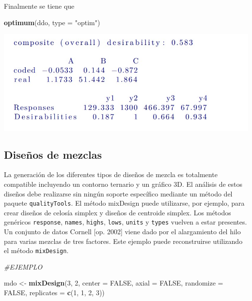 \documentclass[
]{book}
\newenvironment{Shaded}{\begin{snugshade}}{\end{snugshade}}
\newcommand{\AttributeTok}[1]{\textcolor[rgb]{0.13,0.29,0.53}{#1}}
\newcommand{\CommentTok}[1]{\textcolor[rgb]{0.56,0.35,0.01}{\textit{#1}}}
\newcommand{\ConstantTok}[1]{\textcolor[rgb]{0.56,0.35,0.01}{#1}}
\newcommand{\DecValTok}[1]{\textcolor[rgb]{0.00,0.00,0.81}{#1}}
\newcommand{\FunctionTok}[1]{\textcolor[rgb]{0.13,0.29,0.53}{\textbf{#1}}}
\newcommand{\NormalTok}[1]{#1}
\newcommand{\OtherTok}[1]{\textcolor[rgb]{0.56,0.35,0.01}{#1}}
\newcommand{\StringTok}[1]{\textcolor[rgb]{0.31,0.60,0.02}{#1}}
\begin{document}
Finalmente se tiene que

\begin{Shaded}
\begin{Highlighting}[]
\FunctionTok{optimum}\NormalTok{(ddo, }\AttributeTok{type =} \StringTok{"optim"}\NormalTok{)}
\end{Highlighting}
\end{Shaded}

\includegraphics[width=7.29167in,height=\textheight]{graficos/dario4.jpg}

\hypertarget{diseuxf1os-de-mezclas}{%
\subsection{Diseños de mezclas}\label{diseuxf1os-de-mezclas}}

La generación de los diferentes tipos de diseños de mezcla es totalmente compatible
incluyendo un contorno ternario y un gráfico 3D. El análisis de estos diseños debe realizarse sin ningún soporte específico mediante un método del paquete \texttt{qualityTools}.
El método mixDesign puede utilizarse, por ejemplo, para crear diseños de celosía simplex y diseños de centroide simplex.
Los métodos genéricos \texttt{response}, \texttt{names}, \texttt{highs}, \texttt{lows}, \texttt{units} y \texttt{types} vuelven a estar presentes.
Un conjunto de datos Cornell {[}op. 2002{]} viene dado por el alargamiento del hilo para varias mezclas de tres factores. Este ejemplo puede reconstruirse utilizando el método \texttt{mixDesign}.

\begin{Shaded}
\begin{Highlighting}[]
\CommentTok{\#EJEMPLO }

\NormalTok{mdo }\OtherTok{\textless{}{-}} \FunctionTok{mixDesign}\NormalTok{(}\DecValTok{3}\NormalTok{, }\DecValTok{2}\NormalTok{, }\AttributeTok{center =} \ConstantTok{FALSE}\NormalTok{, }\AttributeTok{axial =} \ConstantTok{FALSE}\NormalTok{, }\AttributeTok{randomize =} \ConstantTok{FALSE}\NormalTok{, }\AttributeTok{replicates =} \FunctionTok{c}\NormalTok{(}\DecValTok{1}\NormalTok{, }\DecValTok{1}\NormalTok{, }\DecValTok{2}\NormalTok{, }\DecValTok{3}\NormalTok{))}
\end{Highlighting}
\end{Shaded}
\end{document}

